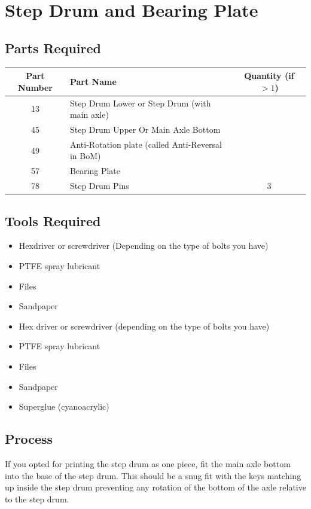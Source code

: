 \documentclass[openany]{book}
\begin{document}
\chapter{Step Drum and Bearing Plate}

\section{Parts Required}

\begin{table}[!ht]
 \centering
 \begin{tabular}{clc}
    Part Number & Part Name & Quantity (if $>1$) \\ \hline
     13 & Step Drum Lower or Step Drum (with main axle) & \\
     45 & Step Drum Upper Or Main Axle Bottom & \\
     49 & Anti-Rotation plate (called Anti-Reversal in BoM) & \\
     57 & Bearing Plate & \\
     78 & Step Drum Pins & 3 
 \end{tabular}
\end{table}

\section{Tools Required}
\begin{itemize}
	\item Hexdriver or screwdriver (Depending on the type of bolts you have)
	\item PTFE spray lubricant
	\item Files
	\item Sandpaper
\end{itemize}

\begin{itemize}
 \item Hex driver or screwdriver (depending on the type of bolts you have)
 \item PTFE spray lubricant
 \item Files
 \item Sandpaper
 \item Superglue (cyanoacrylic)
\end{itemize}




\section{Process}
If you opted for printing the step drum as one piece, fit the main axle bottom into the base of the
step drum. This should be a snug fit with the keys matching up inside the step drum preventing any
rotation of the bottom of the axle relative to the step drum.
\end{document}
